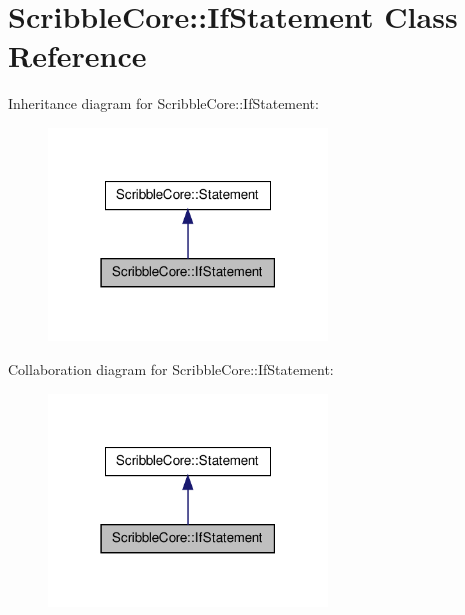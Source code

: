 \hypertarget{class_scribble_core_1_1_if_statement}{\section{Scribble\-Core\-:\-:If\-Statement Class Reference}
\label{class_scribble_core_1_1_if_statement}
}


Inheritance diagram for Scribble\-Core\-:\-:If\-Statement\-:\nopagebreak
\begin{figure}[H]
\begin{center}
\leavevmode
\includegraphics[width=210pt]{class_scribble_core_1_1_if_statement__inherit__graph}
\end{center}
\end{figure}


Collaboration diagram for Scribble\-Core\-:\-:If\-Statement\-:\nopagebreak
\begin{figure}[H]
\begin{center}
\leavevmode
\includegraphics[width=210pt]{class_scribble_core_1_1_if_statement__coll__graph}
\end{center}
\end{figure}
